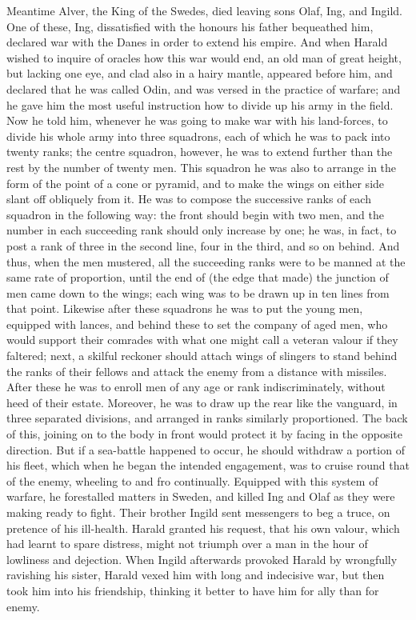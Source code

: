 \documentclass[10pt,a4paper]{report}
\begin{document}
Meantime Alver, the King of the Swedes, died leaving sons Olaf, Ing, and Ingild. One of these, Ing, dissatisfied with the honours his father bequeathed him, declared war with the Danes in order to extend his empire. And when Harald wished to inquire of oracles how this war would end, an old man of great height, but lacking one eye, and clad also in a hairy mantle, appeared before him, and declared that he was called Odin, and was versed in the practice of warfare; and he gave him the most useful instruction how to divide up his army in the field. Now he told him, whenever he was going to make war with his land-forces, to divide his whole army into three squadrons, each of which he was to pack into twenty ranks; the centre squadron, however, he was to extend further than the rest by the number of twenty men. This squadron he was also to arrange in the form of the point of a cone or pyramid, and to make the wings on either side slant off obliquely from it. He was to compose the successive ranks of each squadron in the following way: the front should begin with two men, and the number in each succeeding rank should only increase by one; he was, in fact, to post a rank of three in the second line, four in the third, and so on behind. And thus, when the men mustered, all the succeeding ranks were to be manned at the same rate of proportion, until the end of (the edge that made) the junction of men came down to the wings; each wing was to be drawn up in ten lines from that point. Likewise after these squadrons he was to put the young men, equipped with lances, and behind these to set the company of aged men, who would support their comrades with what one might call a veteran valour if they faltered; next, a skilful reckoner should attach wings of slingers to stand behind the ranks of their fellows and attack the enemy from a distance with missiles. After these he was to enroll men of any age or rank indiscriminately, without heed of their estate. Moreover, he was to draw up the rear like the vanguard, in three separated divisions, and arranged in ranks similarly proportioned. The back of this, joining on to the body in front would protect it by facing in the opposite direction. But if a sea-battle happened to occur, he should withdraw a portion of his fleet, which when he began the intended engagement, was to cruise round that of the enemy, wheeling to and fro continually. Equipped with this system of warfare, he forestalled matters in Sweden, and killed Ing and Olaf as they were making ready to fight. Their brother Ingild sent messengers to beg a truce, on pretence of his ill-health. Harald granted his request, that his own valour, which had learnt to spare distress, might not triumph over a man in the hour of lowliness and dejection. When Ingild afterwards provoked Harald by wrongfully ravishing his sister, Harald vexed him with long and indecisive war, but then took him into his friendship, thinking it better to have him for ally than for enemy.\\
\end{document}

